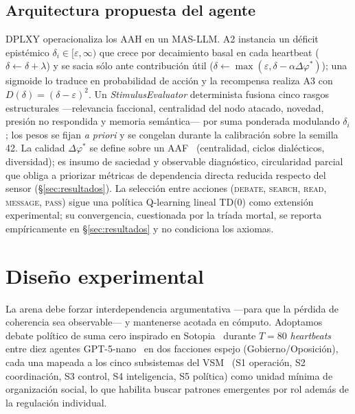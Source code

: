 \documentclass{llncs}
\begin{document}
\subsection{Arquitectura propuesta del agente}
\label{sec:agent-arch}

DPLXY operacionaliza los AAH en un MAS-LLM. A2 instancia un
d\'eficit epist\'emico
$\delta_i{\in}[\varepsilon,\infty)$ que crece por decaimiento basal
en cada heartbeat ($\delta{\leftarrow}\delta{+}\lambda$) y se sacia
s\'olo ante contribuci\'on \'util
($\delta{\leftarrow}\max(\varepsilon,\delta{-}\alpha\Delta\varphi^*)$);
una sigmoide lo traduce en probabilidad de acci\'on y la
recompensa realiza A3 con $D(\delta){=}(\delta{-}\varepsilon)^2$.
Un \emph{StimulusEvaluator} determinista fusiona cinco rasgos
estructurales ---relevancia faccional, centralidad del nodo
atacado, novedad, presi\'on no respondida y memoria sem\'antica---
por suma ponderada modulando $\delta_i$; los pesos se fijan
\emph{a priori} y se congelan durante la calibraci\'on sobre la
semilla 42. La calidad $\Delta\varphi^*$ se define sobre un
AAF~\parencite{dung1995acceptability} (centralidad, ciclos
dial\'ecticos, diversidad); es insumo de saciedad y observable
diagn\'ostico, circularidad parcial que obliga a priorizar
m\'etricas de dependencia directa reducida respecto del sensor
(\S\ref{sec:resultados}). La selecci\'on entre acciones
(\textsc{debate}, \textsc{search}, \textsc{read}, \textsc{message},
\textsc{pass}) sigue una pol\'itica Q-learning lineal TD(0) como
extensi\'on experimental; su convergencia, cuestionada por la
tr\'iada mortal, se reporta emp\'iricamente en \S\ref{sec:resultados}
y no condiciona los axiomas.

\section{Dise\~no experimental}

La arena debe forzar interdependencia argumentativa ---para que la
p\'erdida de coherencia sea observable--- y mantenerse acotada en
c\'omputo. Adoptamos debate pol\'itico de suma cero inspirado en
Sotopia~\parencite{zhou2024sotopia} durante $T{=}80$
\emph{heartbeats} entre diez agentes
GPT-5-nano~\parencite{openai2025gpt5nano} en dos facciones espejo
(Gobierno/Oposici\'on), cada una mapeada a los cinco subsistemas
del VSM~\parencite{beer1972brain} (S1 operaci\'on, S2 coordinaci\'on,
S3 control, S4 inteligencia, S5 pol\'itica) como unidad m\'inima
de organizaci\'on social, lo que habilita buscar patrones
emergentes por rol adem\'as de la regulaci\'on individual.
\end{document}
